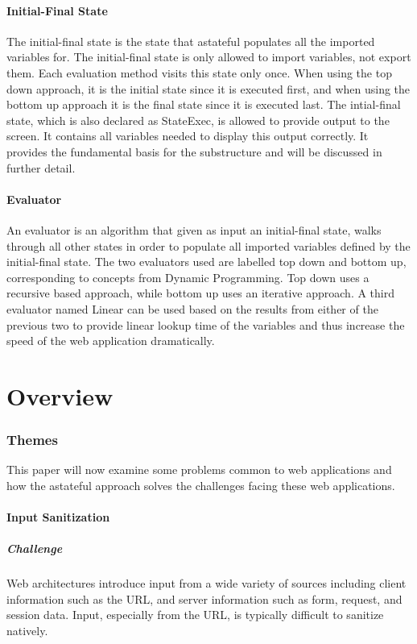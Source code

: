 \documentclass[11pt,twocolumn]{article}
\begin{document}
\subsection{Initial-Final State}
The initial-final state is the state that astateful populates all the imported variables for. The initial-final state is only allowed to import variables, not export them. Each evaluation method visits this state only once. When using the top down approach, it is the initial state since it is executed first, and when using the bottom up approach it is the final state since it is executed last. The intial-final state, which is also declared as StateExec, is allowed to provide output to the screen. It contains all variables needed to display this output correctly. It provides the fundamental basis for the substructure and will be discussed in further detail.

\subsection{Evaluator}
An evaluator is an algorithm that given as input an initial-final state, walks through all other states in order to populate all imported variables defined by the initial-final state.  The two evaluators used are labelled top down and bottom up, corresponding to concepts from Dynamic Programming. Top down uses a recursive based approach, while bottom up uses an iterative approach. A third evaluator named Linear can be used based on the results from either of the previous two to provide linear lookup time of the variables and thus increase the speed of the web application dramatically.

\newpage
\part{Overview}

\section{Themes}
This paper will now examine some problems common to web applications and how the astateful approach solves the challenges facing these web applications.
\subsection{Input Sanitization}
\subsubsection{Challenge}
Web architectures introduce input from a wide variety of sources including client information such as the URL, and server information such as form, request, and session data. Input, especially from the URL, is typically difficult to sanitize natively.
\end{document}
